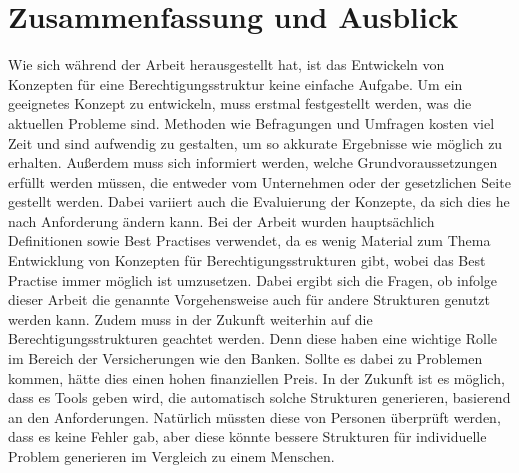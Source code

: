\section{Zusammenfassung und Ausblick}
\label{sec:chapter06:Ausblick}
Wie sich während der Arbeit herausgestellt hat, ist das Entwickeln von Konzepten für eine Berechtigungsstruktur keine einfache Aufgabe.
Um ein geeignetes Konzept zu entwickeln, muss erstmal festgestellt werden, was die aktuellen Probleme sind.
Methoden wie Befragungen und Umfragen kosten viel Zeit und sind aufwendig zu gestalten, um so akkurate Ergebnisse wie möglich zu erhalten.
Außerdem muss sich informiert werden, welche Grundvoraussetzungen erfüllt werden müssen, die entweder vom Unternehmen oder der gesetzlichen Seite gestellt werden.
Dabei variiert auch die Evaluierung der Konzepte, da sich dies he nach Anforderung ändern kann.
\newline
Bei der Arbeit wurden hauptsächlich Definitionen sowie Best Practises verwendet, da es wenig Material zum Thema Entwicklung von Konzepten für Berechtigungsstrukturen gibt, wobei das Best Practise immer möglich ist umzusetzen.
Dabei ergibt sich die Fragen, ob infolge dieser Arbeit die genannte Vorgehensweise auch für andere Strukturen genutzt werden kann.
\newline
Zudem muss in der Zukunft weiterhin auf die Berechtigungsstrukturen geachtet werden.
Denn diese haben eine wichtige Rolle im Bereich der Versicherungen wie den Banken.
Sollte es dabei zu Problemen kommen, hätte dies einen hohen finanziellen Preis.
In der Zukunft ist es möglich, dass es Tools geben wird, die automatisch solche Strukturen generieren, basierend an den Anforderungen.
Natürlich müssten diese von Personen überprüft werden, dass es keine Fehler gab, aber diese könnte bessere Strukturen für individuelle Problem generieren im Vergleich zu einem Menschen.